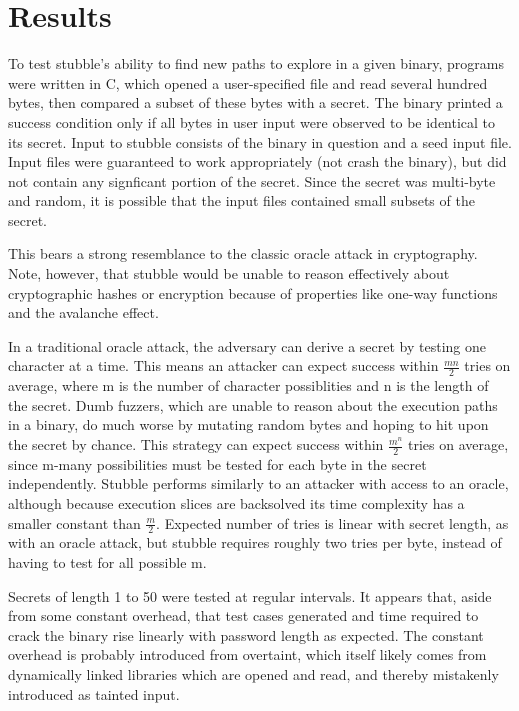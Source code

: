 \documentclass[11pt,expanded,copyright]{fsuthesis}
\begin{document}
\section{Results}

To test stubble's ability to find new paths to explore in a given binary, programs were written in C, which opened a user-specified file and read several hundred bytes, then compared a subset of these bytes with a secret. The binary printed a success condition only if all bytes in user input were observed to be identical to its secret. Input to stubble consists of the binary in question and a seed input file. Input files were guaranteed to work appropriately (not crash the binary), but did not contain any signficant portion of the secret. Since the secret was multi-byte and random, it is possible that the input files contained small subsets of the secret.

This bears a strong resemblance to the classic oracle attack in cryptography. Note, however, that stubble would be unable to reason effectively about cryptographic hashes or encryption because of properties like one-way functions and the avalanche effect.

In a traditional oracle attack, the adversary can derive a secret by testing one character at a time. This means an attacker can expect success within $\frac{mn}{2}$ tries on average, where m is the number of character possiblities and n is the length of the secret. Dumb fuzzers, which are unable to reason about the execution paths in a binary, do much worse by mutating random bytes and hoping to hit upon the secret by chance. This strategy can expect success within $\frac{m^n}{2}$ tries on average, since m-many possibilities must be tested for each byte in the secret independently. Stubble performs similarly to an attacker with access to an oracle, although because execution slices are backsolved its time complexity has a smaller constant than $\frac{m}{2}$. Expected number of tries is linear with secret length, as with an oracle attack, but stubble requires roughly two tries per byte, instead of having to test for all possible m.

Secrets of length 1 to 50 were tested at regular intervals. It appears that, aside from some constant overhead, that test cases generated and time required to crack the binary rise linearly with password length as expected. The constant overhead is probably introduced from overtaint, which itself likely comes from dynamically linked libraries which are opened and read, and thereby mistakenly introduced as tainted input.
\end{document}
